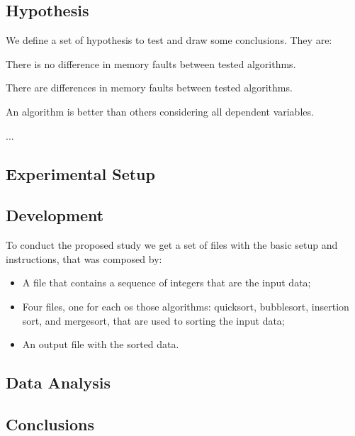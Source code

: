 \subsection{Hypothesis}

We define a set of hypothesis to test and draw some conclusions. They are:

\setcounter{hyp}{-1}
\begin{hyp} \label{hyp:a}There is no difference in memory faults between tested algorithms.\end{hyp}
\begin{hyp} \label{hyp:b}There are differences in memory faults between tested algorithms. \end{hyp}
\begin{hyp} \label{hyp:c} An algorithm is better than others considering all dependent variables. \end{hyp}

\begin{hyp} \label{hyp:d} ... \end{hyp}

\subsection{Experimental Setup}

\subsection{Development}

To conduct the proposed study we get a set of files with the basic setup and instructions, that was composed by:
\begin{itemize}
    \item A file that contains a sequence of integers that are the input data;
    \item Four files, one for each os those algorithms: quicksort, bubblesort, insertion sort, and mergesort, that are used to sorting the input data;
    \item An output file with the sorted data.
\end{itemize}

\subsection{Data Analysis}

\subsection{Conclusions}

